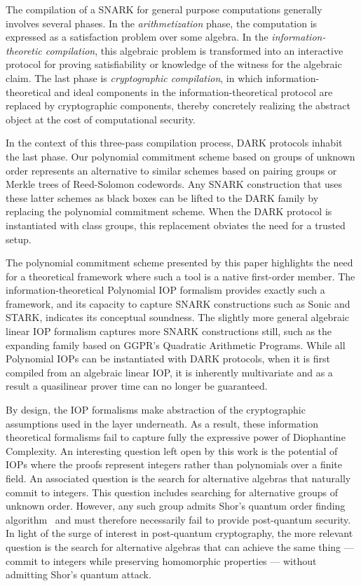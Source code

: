 
The compilation of a SNARK for general purpose computations generally involves several phases. In the \emph{arithmetization} phase, the computation is expressed as a satisfaction problem over some algebra. In the \emph{information-theoretic compilation}, this algebraic problem is transformed into an interactive protocol for proving satisfiability or knowledge of the witness for the algebraic claim. The last phase is \emph{cryptographic compilation}, in which information-theoretical and ideal components in the information-theoretical protocol are replaced by cryptographic components, thereby concretely realizing the abstract object at the cost of computational security. 

In the context of this three-pass compilation process, DARK protocols inhabit the last phase. Our polynomial commitment scheme based on groups of unknown order represents an alternative to similar schemes based on pairing groups or Merkle trees of Reed-Solomon codewords. Any SNARK construction that uses these latter schemes as black boxes can be lifted to the DARK family by replacing the polynomial commitment scheme. When the DARK protocol is instantiated with class groups, this replacement obviates the need for a trusted setup.

The polynomial commitment scheme presented by this paper highlights the need for a theoretical framework where such a tool is a native first-order member.  The information-theoretical Polynomial IOP formalism provides exactly such a framework, and its capacity to capture SNARK constructions such as \textsf{Sonic} and \textsf{STARK}, indicates its conceptual soundness. The slightly more general algebraic linear IOP formalism captures more SNARK constructions still, such as the expanding family based on GGPR's Quadratic Arithmetic Programs. While all Polynomial IOPs can be instantiated with DARK protocols, when it is first compiled from an algebraic linear IOP, it is inherently multivariate and as a result a quasilinear prover time can no longer be guaranteed. 

By design, the IOP formalisms make abstraction of the cryptographic assumptions used in the layer underneath. As a result, these information theoretical formalisms fail to capture fully the expressive power of Diophantine Complexity. An interesting question left open by this work is the potential of IOPs where the proofs represent integers rather than polynomials over a finite field. An associated question is the search for alternative algebras that naturally commit to integers. This question includes searching for alternative groups of unknown order. However, any such group admits Shor's quantum order finding algorithm~\cite{conf/focs/Shor94} and must therefore necessarily fail to provide post-quantum security. In light of the surge of interest in post-quantum cryptography, the more relevant question is the search for alternative algebras that can achieve the same thing --- commit to integers while preserving homomorphic properties --- without admitting Shor's quantum attack.

